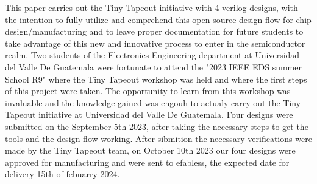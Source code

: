 This paper carries out the Tiny Tapeout initiative with 4 verilog designs,
with the intention to fully utilize and comprehend this open-source design 
flow for chip design/manufacturing and to leave proper documentation for future 
students to take advantage of this new and innovative process to enter in the 
semiconductor realm.
Two students of the Electronics Engineering department at Universidad del Valle De Guatemala were 
fortunate to attend the "2023 IEEE EDS summer School R9" where the Tiny Tapeout workshop was 
held and where the first steps of this project were taken. The opportunity to learn from this 
workshop was invaluable and the knowledge gained was engouh to actualy carry out the 
Tiny Tapeout initiative at Universidad del Valle De Guatemala. Four designs were submitted 
on the September 5th 2023, after taking the necessary steps to get the tools and the 
design flow working. After sibmition the necessary verifications were made by the 
Tiny Tapeout team, on October 10th 2023 our four designs were approved for manufacturing 
and were sent to efabless, the expected date for delivery 15th of febuarry 2024. 
